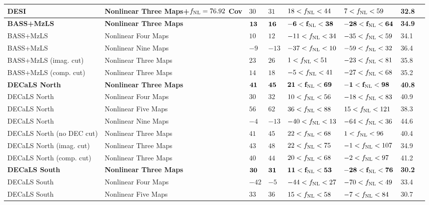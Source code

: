 \begin{table}
{\begin{tabular}{llllllll}
DESI                     & Nonlinear Three Maps+$f_{\rm NL}=76.92$ Cov& $    30$& $    31$& $    18<f_{\rm NL}<    44$& $     7<f_{\rm NL}<    59$ &   32.8\\
\hline
\bf{BASS+MzLS}                 & \bf{Nonlinear Three Maps}& $    \bf{13}$& $    \bf{16}$& $    \bf{-6<f_{\rm NL}<    38}$& $   \bf{-28<f_{\rm NL}<64}$ &   \bf{34.9}\\
BASS+MzLS                 & Nonlinear Four Maps& $    10$& $    12$& $   -11<f_{\rm NL}<    34$& $   -35<f_{\rm NL}<    59$ &   34.1\\
BASS+MzLS                 & Nonlinear Nine Maps& $    -9$& $   -13$& $   -37<f_{\rm NL}<    10$& $   -59<f_{\rm NL}<    32$ &   36.4\\
BASS+MzLS (imag. cut)     & Nonlinear Three Maps& $    23$& $    26$& $     1<f_{\rm NL}<    51$& $   -23<f_{\rm NL}<    81$ &   35.8\\
BASS+MzLS (comp. cut)     & Nonlinear Three Maps& $    14$& $    18$& $    -5<f_{\rm NL}<    41$& $   -27<f_{\rm NL}<    68$ &   35.2\\
\hline
\bf{DECaLS North}              & \bf{Nonlinear Three Maps}& $    \bf{41}$& $    \bf{45}$& $    \bf{21<f_{\rm NL}<    69}$& $    \bf{-1<f_{\rm NL}<    98}$ &   \bf{40.8}\\
DECaLS North              & Nonlinear Four Maps& $    30$& $    32$& $    10<f_{\rm NL}<    56$& $   -18<f_{\rm NL}<    83$ &   40.9\\
DECaLS North              & Nonlinear Five Maps& $    56$& $    62$& $    36<f_{\rm NL}<    88$& $    15<f_{\rm NL}<   121$ &   38.3\\
DECaLS North              & Nonlinear Nine Maps& $    -4$& $   -13$& $   -40<f_{\rm NL}<    13$& $   -64<f_{\rm NL}<    36$ &   44.6\\
DECaLS North (no DEC cut) & Nonlinear Three Maps& $    41$& $    45$& $    22<f_{\rm NL}<    68$& $     1<f_{\rm NL}<    96$ &   40.4\\
DECaLS North (imag. cut)  & Nonlinear Three Maps& $    43$& $    48$& $    22<f_{\rm NL}<    75$& $    -1<f_{\rm NL}<   107$ &   34.9\\
DECaLS North (comp. cut)  & Nonlinear Three Maps& $    40$& $    44$& $    20<f_{\rm NL}<    68$& $    -2<f_{\rm NL}<    97$ &   41.2\\
\hline
\bf{DECaLS South}              & \bf{Nonlinear Three Maps}& $    \bf{30}$& $    \bf{31}$& $    \bf{11<f_{\rm NL}<    53}$& $   \bf{-28<f_{\rm NL}<    76}$ &   \bf{30.2}\\
DECaLS South              & Nonlinear Four Maps& $   -42$& $    -5$& $   -44<f_{\rm NL}<    27$& $   -70<f_{\rm NL}<    49$ &   33.4\\
DECaLS South              & Nonlinear Five Maps& $    33$& $    36$& $    15<f_{\rm NL}<    58$& $    -7<f_{\rm NL}<    84$ &   30.7\\

\end{tabular}}
\end{table}
